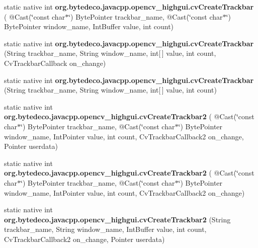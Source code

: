 \begin{DoxyCompactItemize}
\item 
\mbox{\label{group__highgui__c_ga6f28b25948bab42bf38a03a3e210932a}} 
static native int {\bfseries org.\+bytedeco.\+javacpp.\+opencv\+\_\+highgui.\+cv\+Create\+Trackbar} ( @Cast(\char`\"{}const char$\ast$\char`\"{}) Byte\+Pointer trackbar\+\_\+name, @Cast(\char`\"{}const char$\ast$\char`\"{}) Byte\+Pointer window\+\_\+name, Int\+Buffer value, int count)
\item 
\mbox{\label{group__highgui__c_ga18bad2aafe199201f1fd4f6bbdf3caa8}} 
static native int {\bfseries org.\+bytedeco.\+javacpp.\+opencv\+\_\+highgui.\+cv\+Create\+Trackbar} (String trackbar\+\_\+name, String window\+\_\+name, int\mbox{[}$\,$\mbox{]} value, int count, Cv\+Trackbar\+Callback on\+\_\+change)
\item 
\mbox{\label{group__highgui__c_gac2678ea687187d0276eeea06837fb6cc}} 
static native int {\bfseries org.\+bytedeco.\+javacpp.\+opencv\+\_\+highgui.\+cv\+Create\+Trackbar} (String trackbar\+\_\+name, String window\+\_\+name, int\mbox{[}$\,$\mbox{]} value, int count)
\item 
\mbox{\label{group__highgui__c_ga4947b3340d7904ffa9e110fa22f79302}} 
static native int {\bfseries org.\+bytedeco.\+javacpp.\+opencv\+\_\+highgui.\+cv\+Create\+Trackbar2} ( @Cast(\char`\"{}const char$\ast$\char`\"{}) Byte\+Pointer trackbar\+\_\+name, @Cast(\char`\"{}const char$\ast$\char`\"{}) Byte\+Pointer window\+\_\+name, Int\+Pointer value, int count, Cv\+Trackbar\+Callback2 on\+\_\+change, Pointer userdata)
\item 
\mbox{\label{group__highgui__c_ga58c93ab389b041e6bfb75171b62a8969}} 
static native int {\bfseries org.\+bytedeco.\+javacpp.\+opencv\+\_\+highgui.\+cv\+Create\+Trackbar2} ( @Cast(\char`\"{}const char$\ast$\char`\"{}) Byte\+Pointer trackbar\+\_\+name, @Cast(\char`\"{}const char$\ast$\char`\"{}) Byte\+Pointer window\+\_\+name, Int\+Pointer value, int count, Cv\+Trackbar\+Callback2 on\+\_\+change)
\item 
\mbox{\label{group__highgui__c_gac071bf57b7f2b8f15b606c96dc8d3f20}} 
static native int {\bfseries org.\+bytedeco.\+javacpp.\+opencv\+\_\+highgui.\+cv\+Create\+Trackbar2} (String trackbar\+\_\+name, String window\+\_\+name, Int\+Buffer value, int count, Cv\+Trackbar\+Callback2 on\+\_\+change, Pointer userdata)

\end{DoxyCompactItemize}
